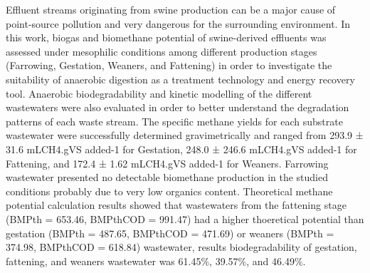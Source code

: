 Effluent streams originating from swine production can be a major cause of point-source pollution and very dangerous for the surrounding environment. In this work, biogas and biomethane potential of swine-derived effluents was assessed under mesophilic conditions among different production stages (Farrowing, Gestation, Weaners, and Fattening) in order to investigate the suitability of anaerobic digestion as a treatment technology and energy recovery tool. Anaerobic biodegradability and kinetic modelling of the different wastewaters were also evaluated in order to better understand the degradation patterns of each waste stream. The specific methane yields for each substrate wastewater were successfully determined gravimetrically and ranged from 293.9 ± 31.6 mLCH4.gVS added-1 for Gestation, 248.0 ± 246.6 mLCH4.gVS added-1 for Fattening, and 172.4 ± 1.62 mLCH4.gVS added-1 for Weaners. Farrowing wastewater presented no detectable biomethane production in the studied conditions probably due to very low organics content.  Theoretical methane potential calculation results showed that wastewaters from the fattening stage (BMPth = 653.46, BMPthCOD = 991.47) had a higher thoeretical potential than gestation (BMPth = 487.65, BMPthCOD = 471.69) or weaners (BMPth = 374.98, BMPthCOD = 618.84) wastewater, results  biodegradability of gestation, fattening, and weaners wastewater was 61.45\%, 39.57\%, and 46.49\%.